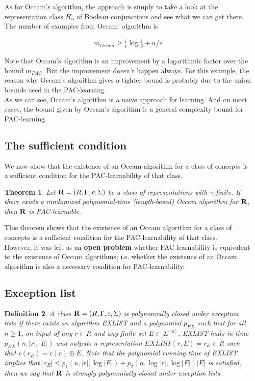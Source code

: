 \documentclass[12pt]{article}
\newtheorem{theorem}{Theorem}
\newtheorem{definition}[theorem]{Definition}
\begin{document}
As for Occam's algorithm, the approach is simply to take a look at the
representation class $H_n$ of Boolean conjunctions and see what we can
get there. The number of examples from Occam' algorithm is

\begin{eqnarray*}
m_{Occam} \ge \frac {1}{\epsilon} \log {\frac {1}{\delta}} + n /
\epsilon
\end{eqnarray*}

Note that Occam's algorithm is an improvement by a logarithmic factor
over the bound $m_{PAC}$. But the improvement doesn't happen
always. For this example, the reason why Occam's algorithm gives a
tighter bound is probably due to the union bounds used in the
PAC-learning. \\

As we can see, Occam's algorithm is a naive approach for learning. And
on most cases, the bound given by Occam's algorithm is a general
complexity bound for PAC-learning.

\subsection{The sufficient condition}

We now show that the existence of an Occam algorithm for a class of
concepts is a sufficient condition for the PAC-learnability of that
class. 

\begin{theorem}
Let ${\bf R} = (R, \Gamma, c, \Sigma)$ be a class of representations
with $\gamma$ finite. If there exists a randomized polynomial-time
(length-based) Occam algorithm for ${\bf R}$, then ${\bf R}$ is
PAC-learnable.
\end{theorem}

This theorem shows that the existence of an Occam algorithm for a
class of concepts is a sufficient condition for the PAC-learnability
of that class. \\

However, it was left as an {\bf open problem} whether PAC-learnability
is equivalent to the existence of Occam algorithms; i.e. whether the
existence of an Occam algorithm is also a necessary condition for 
PAC-learnability.

\subsection{Exception list}

\begin{definition}
A class ${\bf R} = (R, \Gamma, c, \Sigma)$ is polynomially closed
under exception lists if there exists an algorithm EXLIST and a
polynomial $p_{EX}$ such that for all $n \ge 1$, on input of any $r
\in R$ and any finite set $E \subset \Sigma^{[n]}$, EXLIST halts in
time $p_{EX}(n, |r|, |E|)$ and outputs a representation $EXLIST(r, E)
= r_E \in R$ such that $c(r_E) = c(r) \oplus E$. Note that the
polynomial running time of EXLIST implies that $|r_E| \le p_1(n, |r|,
\log |E|) + p_2(n, \log |r|, \log |E|)|E|$ is satisfied, then we say
that ${\bf R}$ is strongly polynomially closed under exception lists.
\end{definition}
\end{document}
